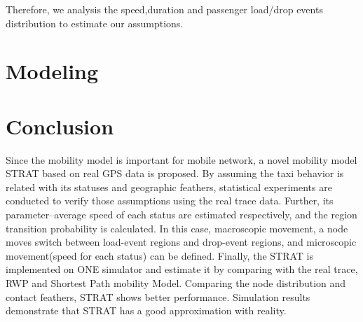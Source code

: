 \documentclass[camera-ready,twocolumn,10pt]{IEEEtran}
\begin{document}
   Therefore, we analysis the speed,duration and passenger load/drop events distribution to estimate our assumptions.








\section{Modeling}
\label{section_modeling}








\section{Conclusion}
\label{section_conclusion}
Since the mobility model is important for mobile network, a novel mobility model STRAT based on real GPS data is proposed. By assuming the taxi behavior is related with its statuses and geographic feathers, statistical experiments are conducted to verify those assumptions using the real trace data. Further, its parameter--average speed of each status are estimated respectively, and the region transition probability is calculated. In this case, macroscopic movement, a node moves switch between load-event regions and drop-event regions, and microscopic movement(speed for each status) can be defined. Finally, the STRAT is implemented on ONE simulator and estimate it by comparing with the real trace, RWP and Shortest Path mobility Model.
Comparing the node distribution and contact feathers, STRAT shows better performance.
Simulation results demonstrate that STRAT has a good approximation with reality.






\end{document}
